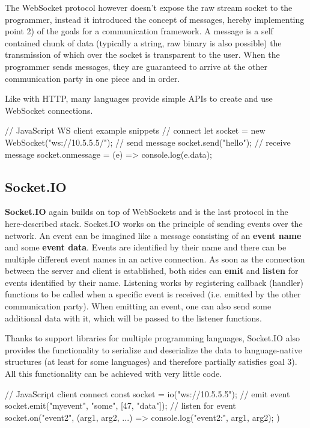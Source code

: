 \documentclass[conference]{IEEEtran}
\begin{document}
The WebSocket protocol however doesn't expose the raw stream socket to the programmer, instead it introduced the concept of messages, hereby implementing point 2) of the goals for a communication framework. A message is a self contained chunk of data (typically a string, raw binary is also possible) the transmission of which over the socket is transparent to the user. When the programmer sends messages, they are guaranteed to arrive at the other communication party in one piece and in order. \cite{b3}

Like with HTTP, many languages provide simple APIs to create and use WebSocket connections.

\begin{code-js}
// JavaScript WS client example snippets
// connect
let socket = new WebSocket("ws://10.5.5.5/");
// send message
socket.send("hello");
// receive message
socket.onmessage = (e) => {
    console.log(e.data);
}
\end{code-js}
\cite{ws-client-mdn}


\subsection{Socket.IO}

\textbf{Socket.IO} again builds on top of WebSockets and is the last protocol in the here-described stack. Socket.IO works on the principle of sending events over the network. An event can be imagined like a message consisting of an \textbf{event name} and some \textbf{event data}. Events are identified by their name and there can be multiple different event names in an active connection. As soon as the connection between the server and client is established, both sides can \textbf{emit} and \textbf{listen} for events identified by their name. Listening works by registering callback (handler) functions to be called when a specific event is received (i.e. emitted by the other communication party). When emitting an event, one can also send some additional data with it, which will be passed to the listener functions. \cite{b1}

Thanks to support libraries for multiple programming languages, Socket.IO also provides the functionality to serialize and deserialize the data to language-native structures (at least for some languages) and therefore partially satisfies goal 3). All this functionality can be achieved with very little code.

\begin{code-js}
// JavaScript client connect
const socket = io("ws://10.5.5.5");
// emit event
socket.emit("myevent", "some", [47, "data"]);
// listen for event
socket.on("event2", (arg1, arg2, ...) => {
    console.log("event2:", arg1, arg2);
})
\end{code-js}
\end{document}
